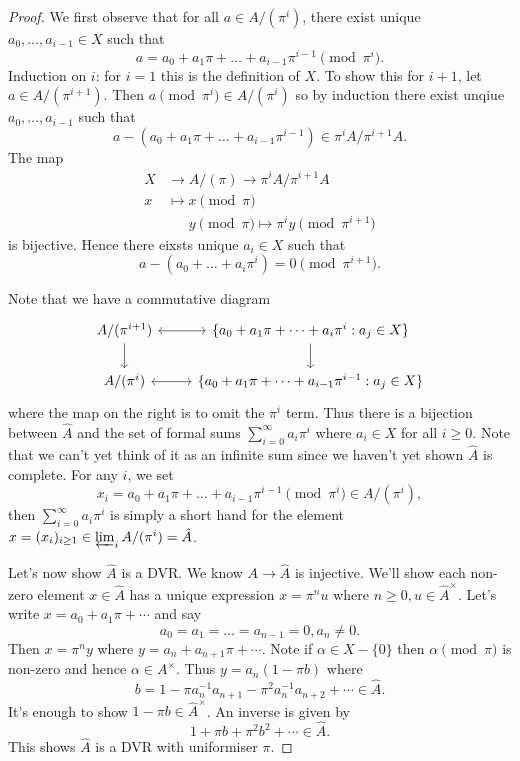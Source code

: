 \documentclass[a4paper]{article}
\begin{document}
\begin{proof}
  We first observe that for all \(a \in A/(\pi^i)\), there exist unique \(a_0, \dots, a_{i - 1} \in X\) such that
  \[
    a = a_0 + a_1 \pi + \dots + a_{i - 1} \pi^{i - 1} \pmod{\pi^i}.
  \]
  Induction on \(i\): for \(i = 1\) this is the definition of \(X\). To show this for \(i + 1\), let \(a \in A/(\pi^{i + 1})\). Then \(a \pmod{\pi^i} \in A/(\pi^i)\) so by induction there exist unqiue \(a_0, \dots, a_{i - 1}\) such that
  \[
    a - (a_0 + a_1 \pi + \dots + a_{i - 1} \pi^{i - 1}) \in \pi^i A/ \pi^{i + 1}A.
  \]
  The map
  \begin{align*}
    X &\to A/(\pi) \to \pi^iA/\pi^{i + 1}A \\
    x &\mapsto x \pmod \pi \\
    &\phantom{\to} y \pmod \pi \mapsto \pi^i y \pmod{\pi^{i + 1}}
  \end{align*}
  is bijective. Hence there eixsts unique \(a_i \in X\) such that
  \[
    a - (a_0 + \dots + a_i \pi^i) = 0 \pmod{\pi^{i + 1}}.
  \]

  Note that we have a commutative diagram
  \[
    \begin{tikzcd}
      A/(\pi^{i + 1}) \ar[r, leftrightarrow] \ar[d] & \{a_0 + a_1 \pi + \dots + a_i \pi^i: a_j \in X\} \ar[d] \\
      A/(\pi^i) \ar[r, leftrightarrow] & \{a_0 + a_1 \pi + \dots + a_{i - 1} \pi^{i - 1}: a_j \in X\}
    \end{tikzcd}
  \]
  where the map on the right is to omit the \(\pi^i\) term. Thus there is a bijection between \(\hat A\) and the set of formal sums \(\sum_{i = 0}^\infty a_i \pi^i\) where \(a_i \in X\) for all \(i \geq 0\). Note that we can't yet think of it as an infinite sum since we haven't yet shown \(\hat A\) is complete. For any \(i\), we set
  \[
    x_ i = a_0 + a_1\pi + \dots + a_{i - 1}\pi^{i - 1} \pmod{\pi^i} \in A/(\pi^i),
  \]
  then \(\sum_{i = 0}^\infty a_i\pi^i\) is simply a short hand for the element \(x = (x_i)_{i \geq 1} \in \varprojlim_i A/(\pi^i) = \hat A\).

  Let's now show \(\hat A\) is a DVR. We know \(A \to \hat A\) is injective. We'll show each non-zero element \(x \in \hat A\) has a unique expression \(x = \pi^n u\) where \(n \geq 0, u \in \hat A^\times\). Let's write \(x = a_0 + a_1 \pi + \cdots\) and say
  \[
    a_0 = a_1 = \dots = a_{n - 1} = 0, a_n \neq 0.
  \]
  Then \(x = \pi^n y\) where \(y = a_n + a_{n + 1} \pi + \cdots\). Note if \(\alpha \in X - \{0\}\) then \(\alpha \pmod \pi\) is non-zero and hence \(\alpha \in A^\times\). Thus \(y = a_n(1 - \pi b)\) where
  \[
    b = 1 - \pi a_n^{-1} a_{n + 1} - \pi^2 a_n^{-1} a_{n + 2} + \cdots \in \hat A.
  \]
  It's enough to show \(1 - \pi b \in \hat A^\times\). An inverse is given by
  \[
    1 + \pi b + \pi^2 b^2 + \cdots \in \hat A.
  \]
  This shows \(\hat A\) is a DVR with uniformiser \(\pi\).


\end{proof}
\end{document}
